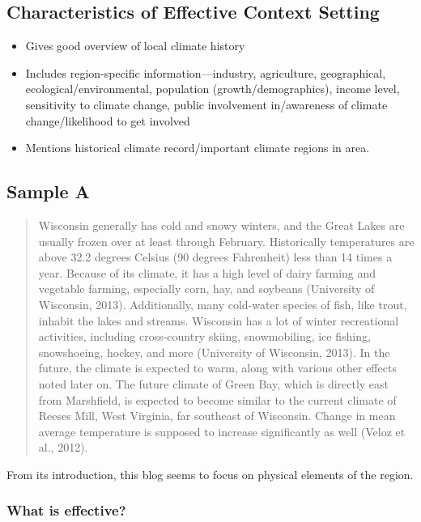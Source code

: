\documentclass{article}\usepackage[]{graphicx}\usepackage[]{color}
\begin{document}
\subsection{Characteristics of Effective Context Setting}

\begin{itemize}
  \item Gives good overview of local climate history
  \item Includes region-specific information—industry, agriculture, geographical, ecological/environmental, population (growth/demographics), income level, sensitivity to climate change, public involvement in/awareness of climate change/likelihood to get involved
  \item Mentions historical climate record/important climate regions in area.
\end{itemize}

\subsection{Sample A}

\begin{quote}
Wisconsin generally has cold and snowy winters, and the Great Lakes are usually frozen over at least through February. Historically temperatures are above 32.2 degrees Celsius (90 degrees Fahrenheit) less than 14 times a year. Because of its climate, it has a high level of dairy farming and vegetable farming, especially corn, hay, and soybeans (University of Wisconsin, 2013). Additionally, many cold-water species of fish, like trout, inhabit the lakes and streams. Wisconsin has a lot of winter recreational activities, including cross-country skiing, snowmobiling, ice fishing, snowshoeing, hockey, and more (University of Wisconsin, 2013). In the future, the climate is expected to warm, along with various other effects noted later on. The future climate of Green Bay, which is directly east from Marshfield, is expected to become similar to the current climate of Reeses Mill, West Virginia, far southeast of Wisconsin. Change in mean average temperature is supposed to increase significantly as well (Veloz et al., 2012). 
\end{quote}

From its introduction, this blog seems to focus on physical elements of the region.

\subsubsection{What is effective?}
\end{document}
